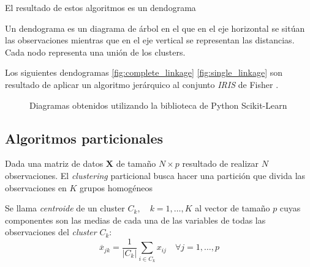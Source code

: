 \noindent El resultado de estos algoritmos es un dendograma \cite{Mardia 1979}
\begin{defi}
Un dendograma es un diagrama de árbol en el que en el eje horizontal se sitúan las observaciones mientras que en el eje vertical se representan las distancias. Cada nodo representa una unión de los clusters. 
\end{defi}

\noindent Los siguientes dendogramas \ref{fig:complete_linkage} \ref{fig:single_linkage}  son resultado de aplicar un algoritmo jerárquico al conjunto \emph{IRIS} de Fisher \cite{Iris Fisher}.
\begin{figure}[h]
 \centering
 \caption{Diagramas obtenidos utilizando la biblioteca de Python Scikit-Learn}
 \label{fig:Dendogramas distintos enlaces }
\end{figure}
\newpage
\subsection{Algoritmos particionales}

\noindent Dada una matriz de datos $\mathbf{X}$ de tamaño $N\times p$ resultado de realizar $N$ observaciones. El \emph{clustering} particional busca hacer una partición que divida las observaciones en $K$ grupos homogéneos 

\begin{defi}
Se llama \emph{centroide} de un cluster $C_k,\quad k=1,\ldots,K$ al vector de tamaño $p$ cuyas componentes son las medias de cada una de las variables de todas las observaciones del \emph{cluster} $C_k$:
\begin{equation}
\overline{x}_{jk}=\dfrac{1}{|C_k|}\sum_{i\in C_k}  x_{ij} \quad \forall j=1,\ldots, p
\end{equation}
\end{defi}

